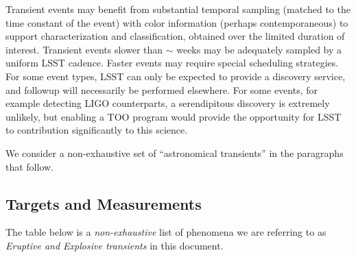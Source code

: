 Transient events may benefit from substantial temporal sampling
(matched to the time constant of the event) with color information
(perhaps contemporaneous) to support characterization and
classification, obtained over the limited duration of interest.
Transient events slower than $\sim$ weeks may be adequately sampled by
a uniform LSST cadence.  Faster events may require special scheduling
strategies.  For some event types, LSST can only be expected to
provide a discovery service, and followup will necessarily be
performed elsewhere.  For some events, for example detecting LIGO
counterparts, a serendipitous discovery is extremely unlikely, but
enabling a TOO program would provide the opportunity for LSST to
contribution significantly to this science.


We consider a non-exhaustive set of ``astronomical transients'' in the
paragraphs that follow.

\subsection{Targets and Measurements}
\label{sec:\chpname:targets}

The table below is a \emph{non-exhaustive} list of
phenomena we are referring to as \emph{Eruptive and Explosive
  transients} in this document.

